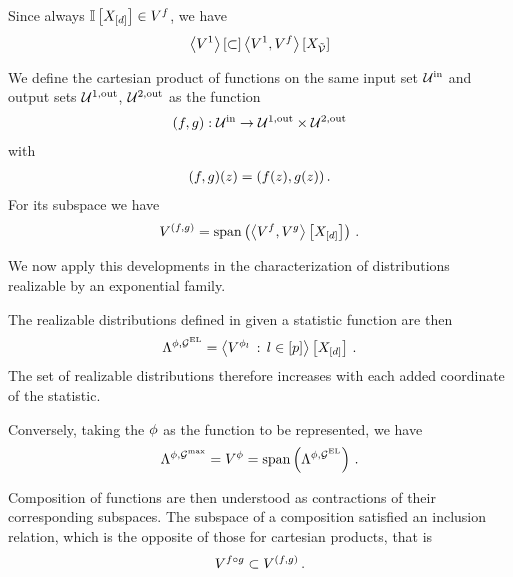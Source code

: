Since always $\mathbb{I}\left[X_{[d]}\right]\in V^{f}$, we have
\begin{align*}
    \left\langle V^{1}\right\rangle \left[ \subset \right] \left\langle V^{1},V^{f}\right\rangle \left[ X_{\tilde{\mathcal{V}}} \right]
\end{align*}

We define the cartesian product of functions on the same input set $\mathcal{U}^{\mathrm{in}}$ and output sets $\mathcal{U}^{1,\mathrm{out}}$, $\mathcal{U}^{2,\mathrm{out}}$ as the function
\begin{align*}
    (f,g) : \mathcal{U}^{\mathrm{in}} \rightarrow \mathcal{U}^{1,\mathrm{out}} \times \mathcal{U}^{2,\mathrm{out}}
\end{align*}
with
\begin{align*}
    (f,g)(z) = (f(z),g(z)) \, .
\end{align*}
For its subspace we have
\begin{align*}
    V^{(f,g)}
    = \mathrm{span}\left(\left\langle V^{f},V^{g}\right\rangle \left[ X_{[d]} \right]\right) \, .
\end{align*}

We now apply this developments in the characterization of distributions realizable by an exponential family.

\begin{example}
    The realizable distributions defined in  given a statistic function are then
    \begin{align*}
        \Lambda^{\phi,\mathcal{G}^{\mathrm{EL}}} = \left\langle V^{\phi_{l}} \, : \, l\in[p]\right\rangle \left[ X_{[d]} \right] \, .
    \end{align*}
    The set of realizable distributions therefore increases with each added coordinate of the statistic.

    Conversely, taking the $\phi$ as the function to be represented, we have
    \begin{align*}
        \Lambda^{\phi,\mathcal{G}^{\mathrm{max}}} = V^{\phi} = \mathrm{span}\left(\Lambda^{\phi,\mathcal{G}^{\mathrm{EL}}}\right) \, .
    \end{align*}
\end{example}


Composition of functions are then understood as contractions of their corresponding subspaces.
The subspace of a composition satisfied an inclusion relation, which is the opposite of those for cartesian products, that is
\begin{align}
    V^{f\circ g}
    \subset V^{(f,g)} \, .
\end{align}

